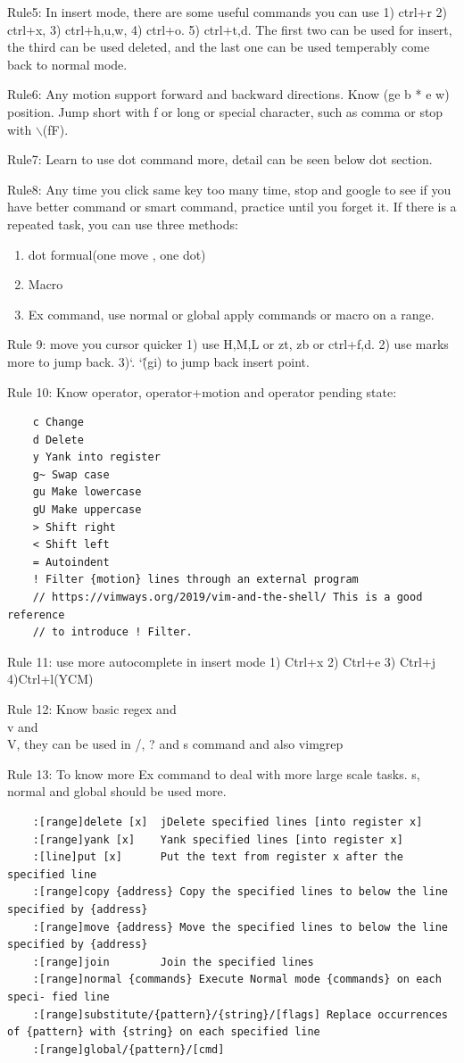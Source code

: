 \documentclass[paper=8.5in:11in, twoside, 12pt, pagesize=pdftex]{book}
\begin{document}
Rule5: In insert mode, there are some useful commands you can use 1) ctrl+r 2) ctrl+x, 3) ctrl+h,u,w, 4) ctrl+o. 5) ctrl+t,d. The first two can be used for insert, the third can be used deleted, and the last one can be used temperably come back to normal mode.

Rule6: Any motion support forward and backward directions. Know (ge b * e w) position. Jump short with f or long or special character, such as comma or stop with $\backslash$(fF).

Rule7: Learn to use dot command more, detail can be seen below dot section.

Rule8: Any time you click same key too many time, stop and google to see if you have better command or smart command, practice until you forget it. If there is a repeated task, you can use three methods:
\begin{enumerate}
	\item dot formual(one move , one dot)
	\item Macro 
	\item Ex command, use normal or global apply commands or macro on a range.
\end{enumerate}

Rule 9: move you cursor quicker 1) use H,M,L or zt, zb or ctrl+f,d. 2) use marks more to jump back. 3)`. `\^(gi) to jump back insert point.

Rule 10: Know operator, operator+motion and operator pending state:
\begin{verbatim}
	c Change
	d Delete
	y Yank into register
	g~ Swap case
	gu Make lowercase
	gU Make uppercase
	> Shift right
	< Shift left
	= Autoindent
	! Filter {motion} lines through an external program
	// https://vimways.org/2019/vim-and-the-shell/ This is a good reference 
	// to introduce ! Filter.
\end{verbatim}	
Rule 11: use more autocomplete in insert mode 1) Ctrl+x 2) Ctrl+e 3) Ctrl+j 4)Ctrl+l(YCM)

Rule 12: Know basic regex and \\v and \\V, they can be used in /, ? and s command and also vimgrep

Rule 13: To know more Ex command to deal with more large scale tasks. s, normal and global should be used more. 

\begin{verbatim}
	:[range]delete [x]  jDelete specified lines [into register x]
	:[range]yank [x]    Yank specified lines [into register x]
	:[line]put [x]      Put the text from register x after the specified line
	:[range]copy {address} Copy the specified lines to below the line specified by {address}
	:[range]move {address} Move the specified lines to below the line specified by {address}
	:[range]join        Join the specified lines
	:[range]normal {commands} Execute Normal mode {commands} on each speci- fied line
	:[range]substitute/{pattern}/{string}/[flags] Replace occurrences of {pattern} with {string} on each specified line 
	:[range]global/{pattern}/[cmd]
\end{verbatim}
\end{document}
